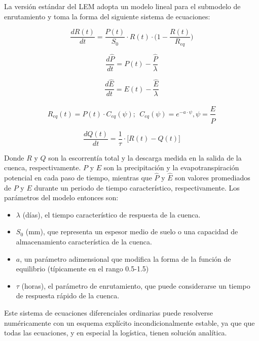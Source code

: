 La versión estándar del LEM adopta un modelo lineal para el submodelo de enrutamiento y toma la forma del siguiente sistema 
de ecuaciones:


\begin{equation}
    \frac{d R(t)}{dt}=\frac{P(t)}{S_0}\cdot R(t)\cdot\big(1-\frac{R(t)}{R_{eq}}\big)
\end{equation}

\begin{equation}
    \frac{d \hat{P}}{dt}=P(t)-\frac{\hat{P}}{\lambda}
\end{equation}


\begin{equation}
    \frac{d \hat{E}}{dt}=E(t)-\frac{\hat{E}}{\lambda}
\end{equation}


\begin{equation}
    R_{eq}(t)=P(t)\cdot C_{eq}(\psi);\ \ C_{eq}(\psi)=e^{-a\cdot \psi}, \psi=\frac{\hat{E}}{\hat{P}}
\end{equation}


\begin{equation}
    \frac{d Q(t)}{dt}=\frac{1}{\tau}\cdot \big[R(t)-Q(t)\big]
\end{equation}


Donde $R$ y $Q$ son la escorrentía total y la descarga medida en la salida de la cuenca, respectivamente. 
$P$ y $E$ son la precipitación y la evapotranspiración potencial en cada paso de tiempo, mientras que $\hat{P}$ y $\hat{E}$ 
son valores promediados de $P$ y $E$ durante un periodo de tiempo característico, respectivamente. 
Los parámetros del modelo entonces son:
\begin{itemize}
    \item $\lambda$ (días), el tiempo característico de respuesta  de la cuenca. %
    \item $S_0$ (mm), que representa un espesor medio de suelo o una capacidad de almacenamiento característica de la cuenca.
    \item $a$, un parámetro adimensional que modifica la forma de la función de equilibrio (típicamente en el rango 0.5-1.5)
    \item $\tau$ (horas), el parámetro de enrutamiento, que puede considerarse un tiempo 
    de respuesta rápido de la cuenca.
\end{itemize}
Este sistema de ecuaciones diferenciales ordinarias puede resolverse numéricamente con un esquema explícito 
incondicionalmente estable, ya que  que todas las ecuaciones, y en especial la logística, tienen solución analítica.

